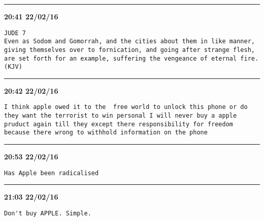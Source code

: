 \hrule%

\begin{adjustwidth}{0cm}{0cm}
\footnotesize \textbf{20:41 22/02/16}

\begin{lstlisting}[breaklines, breakatwhitespace, basicstyle=\small, frame=leftline]
JUDE 7
Even as Sodom and Gomorrah, and the cities about them in like manner, giving themselves over to fornication, and going after strange flesh, are set forth for an example, suffering the vengeance of eternal fire.(KJV)
\end{lstlisting}
\end{adjustwidth}

\hrule%

\begin{adjustwidth}{0cm}{0cm}
\footnotesize \textbf{20:42 22/02/16}

\begin{lstlisting}[breaklines, breakatwhitespace, basicstyle=\small, frame=leftline]
I think apple owed it to the  free world to unlock this phone or do they want the terrorist to win personal I will never buy a apple  pruduct again till they except there responsibility for freedom because there wrong to withhold information on the phone
\end{lstlisting}
\end{adjustwidth}

\hrule%

\begin{adjustwidth}{0cm}{0cm}
\footnotesize \textbf{20:53 22/02/16}

\begin{lstlisting}[breaklines, breakatwhitespace, basicstyle=\small, frame=leftline]
Has Apple been radicalised
\end{lstlisting}
\end{adjustwidth}

\hrule%

\begin{adjustwidth}{0cm}{0cm}
\footnotesize \textbf{21:03 22/02/16}

\begin{lstlisting}[breaklines, breakatwhitespace, basicstyle=\small, frame=leftline]
Don't buy APPLE. Simple.
\end{lstlisting}
\end{adjustwidth}

